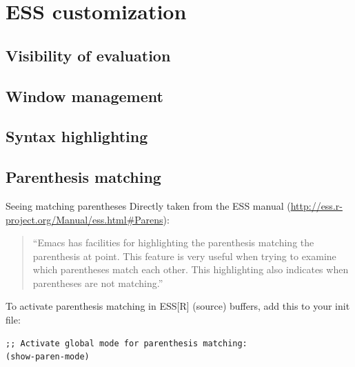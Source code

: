 \documentclass[presentation]{beamer}
\begin{document}
\section{ESS customization}
\label{sec:org1cf52e6}
\subsection{Visibility of evaluation}
\label{sec:org6174904}
\subsection{Window management}
\label{sec:orgeb88dc5}
\subsection{Syntax highlighting}
\label{sec:orga7418c0}
\subsection{Parenthesis matching}
\label{sec:org0b11a61}
\begin{frame}[label={sec:orgf038c51},fragile]{Seeing matching parentheses}
 Directly taken from the ESS manual (\url{http://ess.r-project.org/Manual/ess.html\#Parens}):

\begin{quote}
``Emacs has facilities for highlighting the parenthesis matching the parenthesis at point. This feature is very useful when trying to examine which parentheses match each other. This highlighting also indicates when parentheses are not matching.''
\end{quote}

To activate parenthesis matching in ESS[R] (source) buffers, add this to your init file:

\begin{verbatim}
;; Activate global mode for parenthesis matching:
(show-paren-mode)
\end{verbatim}
\end{frame}
\end{document}
